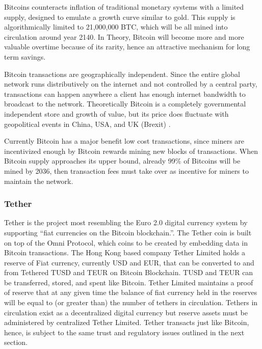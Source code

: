 \documentclass[a4paper,12pt]{article} %
\begin{document}
Bitcoins counteracts inflation of traditional monetary systems with a limited supply, designed to emulate a growth curve similar to gold. This supply is algorithmically limited to 21,000,000 BTC, which will be all mined into circulation around year 2140. In Theory, Bitcoin will become more and more valuable overtime because of its rarity, hence an attractive mechanism for long term savings.

Bitcoin transactions are geographically independent. Since the entire global network runs distributively on the internet and not controlled by a central party, transactions can happen anywhere a client has enough internet bandwidth to broadcast to the network. Theoretically  Bitcoin is a completely governmental independent store and growth of value, but its price does fluctuate with geopolitical events in China, USA, and UK (Brexit) .

Currently Bitcoin has a major benefit low cost transactions, since miners are incentivized enough by Bitcoin rewards mining new blocks of transactions. When Bitcoin supply approaches its upper bound, already 99\% of Bitcoins will be mined by 2036, then transaction fees must take over as incentive for miners to maintain the network.

\subsubsection{Tether} \label{sssec:2:tether}

Tether is the project most resembling the Euro 2.0 digital currency system by supporting ``fiat currencies on the Bitcoin blockchain.''\cite{tether}. The Tether coin is built on top of the Omni Protocol, which coins to be created by embedding data in Bitcoin transactions\cite{omniProtocolSpec}. The Hong Kong based company Tether Limited holds a reserve of Fiat currency, currently USD and EUR, that can be converted to and from Tethered TUSD and TEUR on Bitcoin Blockchain. TUSD and TEUR can be transferred, stored, and spent like Bitcoin. Tether Limited maintains a proof of reserve that at any given time the balance of fiat currency held in the reserves will be equal to (or greater than) the number of tethers in circulation. Tethers in circulation exist as a decentralized digital currency but reserve assets must be administered by centralized Tether Limited. Tether transacts just like Bitcoin, hence, is subject to the same trust and regulatory issues outlined in the next section.
\end{document}

